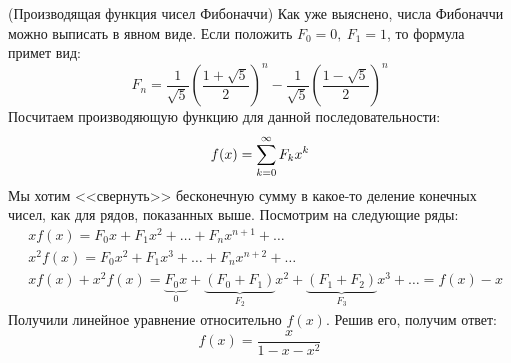 \begin{example} (Производящая функция чисел Фибоначчи)
	Как уже выяснено, числа Фибоначчи можно выписать в явном виде. Если положить $F_0 = 0,\ F_1 = 1$, то формула примет вид:
	\[
		F_n = \frac{1}{\sqrt{5}}\left(\frac{1 + \sqrt{5}}{2}\right)^n - \frac{1}{\sqrt{5}}\left(\frac{1 - \sqrt{5}}{2}\right)^n
	\]
	Посчитаем производяющую функцию для данной последовательности:
	\[
		f(x) = \sum\limits_{k = 0}^\infty F_k x^k
	\]
	Мы хотим <<свернуть>> бесконечную сумму в какое-то деление конечных чисел, как для рядов, показанных выше. Посмотрим на следующие ряды:
	\begin{align*}
		&{xf(x) = F_0 x + F_1 x^2 + \ldots + F_n x^{n + 1} + \ldots}
		\\
		&{x^2f(x) = F_0 x^2 + F_1 x^3 + \ldots + F_n x^{n + 2} + \ldots}
		\\
		&{xf(x) + x^2f(x) = \underbrace{F_0 x}_{0} + \underbrace{(F_0 + F_1)}_{F_2}x^2 + \underbrace{(F_1 + F_2)}_{F_3}x^3 + \ldots = f(x) - x}
	\end{align*}
	Получили линейное уравнение относительно $f(x)$. Решив его, получим ответ:
	\[
		f(x) = \frac{x}{1 - x - x^2}
	\]
\end{example}